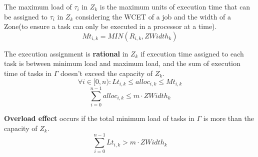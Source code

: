 \begin{defi}
The maximum load of $\tau_i$ in $Z_k$ is the maximum units of execution time that can be assigned to $\tau_i$ in $Z_k$ considering the WCET of a job and the width of a Zone(to ensure a task can only be executed in a processor at a time).
\[
	Mt_{i,k}=MIN(R_{i,k}, ZWidth_k)
\]
\end{defi}

\begin{defi}
The execution assignment is \textbf{rational} in $Z_k$ if execution time assigned to each task is between minimum load and maximum load, and the sum of execution time of tasks in $\Gamma$ doesn't exceed the capacity of $Z_k$.
\[
	\forall i \in [0,n) : Lt_{i,k} \leq alloc_{i,k} \leq Mt_{i,k}
\]
\[
	\sum\limits_{i=0}^{n-1}alloc_{i,k} \leq m \cdot ZWidth_k
\]
\end{defi}

\begin{defi}
\textbf{Overload effect} occurs if the total minimum load of tasks in $\Gamma$ is more than the capacity of $Z_k$.
\[
	\sum\limits_{i=0}^{n-1}Lt_{i,k} > m \cdot ZWidth_k
\]
\end{defi}

